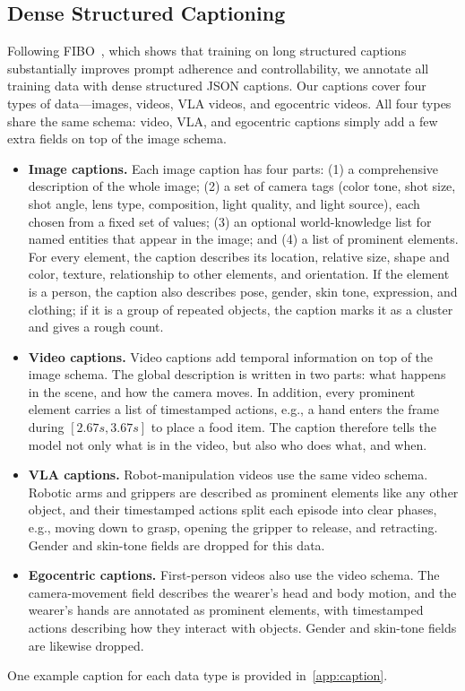 \subsection{Dense Structured Captioning} \label{subsec:dense_captioning}
Following FIBO~\cite{gutflaish2025fibo}, which shows that training on long structured
captions substantially improves prompt adherence and controllability, we
annotate all training data with dense structured JSON captions. Our captions
cover four types of data---images, videos, VLA videos, and egocentric
videos. All four types share the same schema: video, VLA, and egocentric
captions simply add a few extra fields on top of the image schema.
\begin{itemize}
  \item \textbf{Image captions.} Each image caption has four parts: (1) a
  comprehensive description of the whole image; (2) a set of camera tags
  (color tone, shot size, shot angle, lens type, composition,
  light quality, and light source),
  each chosen from a fixed set of values; (3) an optional world-knowledge
  list for named entities that appear in the image; and (4) a list of
  prominent elements. For every element, the caption describes its location,
  relative size, shape and color, texture, relationship to other elements,
  and orientation. If the element is a person, the caption also describes
  pose, gender, skin tone, expression, and clothing; if it is a group of repeated objects, the
  caption marks it as a cluster and gives a rough count.
  \item \textbf{Video captions.} Video captions add temporal information on
  top of the image schema. The global description is written in two parts:
  what happens in the scene, and how the camera moves. In addition, every
  prominent element carries a list of timestamped actions, e.g., a hand
  enters the frame during $[2.67s, 3.67s]$ to place a food item. The caption
  therefore tells the model not only what is in the video, but also who does
  what, and when.
  \item \textbf{VLA captions.} Robot-manipulation videos use the same video
  schema. Robotic arms and grippers are described as prominent elements like
  any other object, and their timestamped actions split each episode into
  clear phases, e.g., moving down to grasp, opening the gripper to release,
  and retracting. Gender and skin-tone fields are dropped for this data.
  \item \textbf{Egocentric captions.} First-person videos also use the video
  schema. The camera-movement field describes the wearer's head and body
  motion, and the wearer's hands are annotated as prominent elements, with
  timestamped actions describing how they interact with objects. Gender and
  skin-tone fields are likewise dropped.
\end{itemize}
One example caption for each data type is provided in~\cref{app:caption}.

